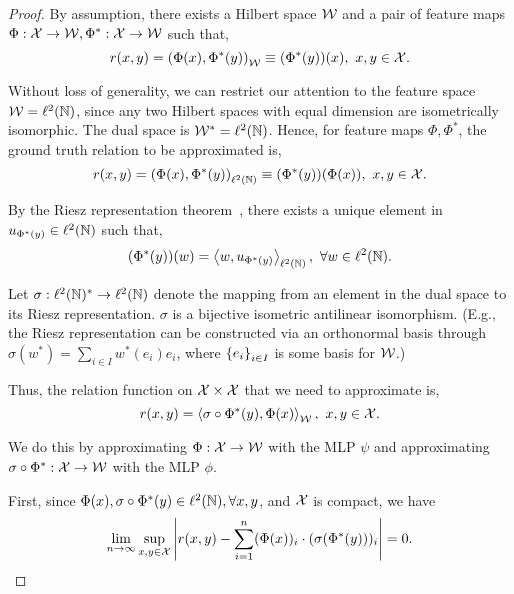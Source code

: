 \begin{proof}
    \hphantom{~}

    By assumption, there exists a Hilbert space ${\mathcal{W}}$ and a pair of feature maps $\Phi: {\mathcal{X}} \to {\mathcal{W}}, \Phi^*: {\mathcal{X}} \to {\mathcal{W}}$ such that,
    \begin{equation*}
        r(x, y) = \paren{\Phi(x), \Phi^*(y)}_{\calW} \equiv (\Phi^*(y))(x), \ x, y \in \calX.
    \end{equation*}

    Without loss of generality, we can restrict our attention to the feature space ${\mathcal{W}} = \ell^2({\mathbb{N}})$, since any two Hilbert spaces with equal dimension are isometrically isomorphic. The dual space is ${\mathcal{W}}^* = \ell^2({\mathbb{N}})$. Hence, for feature maps $\Phi, \Phi^*$, the ground truth relation to be approximated is,
    \begin{equation*}
        r(x, y) = \paren{\Phi(x), \Phi^*(y)}_{\ell^2(\bbN)} \equiv (\Phi^*(y))(\Phi(x)), \ x, y \in \calX.
    \end{equation*}

    By the Riesz representation theorem~\parencite{riesz_citation}, there exists a unique element in $u_{\Phi^*(y)} \in \ell^2({\mathbb{N}})$ such that,
    \begin{equation*}
        (\Phi^*(y))(w) = \iprod{w}{u_{\Phi^*(y)}}_{\ell^2(\bbN)}, \ \forall w \in \ell^2(\bbN).
    \end{equation*}

    Let $\sigma: \ell^2({\mathbb{N}})^* \to \ell^2({\mathbb{N}})$ denote the mapping from an element in the dual space to its Riesz representation. $\sigma$ is a bijective isometric antilinear isomorphism. (E.g., the Riesz representation can be constructed via an orthonormal basis through $\sigma(w^*) = \sum_{i \in I} w^{*}(e_i) e_i$, where $\left\{e_i\right\}_{i \in I}$ is some basis for ${\mathcal{W}}$.)

    Thus, the relation function on ${\mathcal{X}} \times {\mathcal{X}}$ that we need to approximate is,
    \begin{equation*}
        r(x, y) = \iprod{\sigma \circ \Phi^* (y)}{\Phi(x)}_{\calW}, \ x, y \in \calX.
    \end{equation*}

    We do this by approximating $\Phi: {\mathcal{X}} \to {\mathcal{W}}$ with the MLP $\psi$ and approximating $\sigma \circ \Phi^*: {\mathcal{X}} \to {\mathcal{W}}$ with the MLP $\phi$.

    First, since $\Phi(x), \sigma \circ \Phi^*(y) \in \ell^2({\mathbb{N}}), \forall x, y$, and ${\mathcal{X}}$ is compact, we have
    \begin{equation*}
        \lim_{n \to \infty} \sup_{x,y \in \calX} \abs{r(x, y) - \sum_{i=1}^{n} (\Phi(x))_i \cdot (\sigma(\Phi^*(y)))_i} = 0.
    \end{equation*}


\end{proof}

